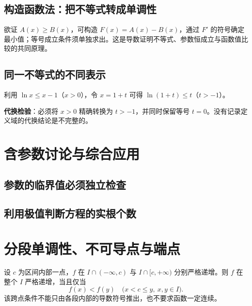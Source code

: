 \subsection{构造函数法：把不等式转成单调性}
\begin{methodbox}
欲证 $A(x)\ge B(x)$，可构造 $F(x)=A(x)-B(x)$，通过 $F'$ 的符号确定最小值；等号成立条件须单独求出。这是导数证明不等式、参数恒成立与函数值比较的共同原理。
\end{methodbox}



\subsection{同一不等式的不同表示}
利用 $\ln x\le x-1$（$x>0$），令 $x=1+t$ 可得 $\ln(1+t)\le t$（$t>-1$）。
\begin{methodbox}
\textbf{代换检验}：必须将 $x>0$ 精确转换为 $t>-1$，并同时保留等号 $t=0$。没有记录定义域的代换结论是不完整的。
\end{methodbox}

\section{含参数讨论与综合应用}

\subsection{参数的临界值必须独立检查}


\subsection{利用极值判断方程的实根个数}

\section{分段单调性、不可导点与端点}

\begin{knowledgebox}[title=分段函数严格递增的跨点条件]
设 $c$ 为区间内部一点，$f$ 在 $I\cap(-\infty,c)$ 与 $I\cap[c,+\infty)$ 分别严格递增。则 $f$ 在整个 $I$ 严格递增，当且仅当
\[
f(x)<f(y)\quad\bigl(x<c\le y,\ x,y\in I\bigr).
\]
该跨点条件不能只由各段内部的导数符号推出，也不要求函数一定连续。
\end{knowledgebox}

